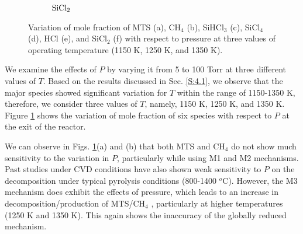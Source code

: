 \documentclass[final, letterpaper, square, comma, numbers, sort&compress]{elsarticle}
\begin{document}
\begin{figure}
\begin{subfigure}{0.49\textwidth}
        \caption{$\rm SiCl_2$}
    \end{subfigure}
    \caption{Variation of mole fraction of MTS (a), CH$_4$ (b), SiHCl$_3$ (c), SiCl$_4$ (d), HCl (e), and SiCl$_2$ (f) with respect to pressure at three values of operating temperature (1150 K, 1250 K, and 1350 K).}
    \label{fig:7}
\end{figure}

We examine the effects of $P$ by varying it from 5 to 100 Torr at three different values of $T$. Based on the results discussed in Sec. \ref{S:4.1}, we observe that the major species showed significant variation for $T$ within the range of 1150-1350 K, therefore, we consider three values of $T$, namely, 1150 K, 1250 K, and 1350 K. Figure \ref{fig:7} shows the variation of mole fraction of six species with respect to $P$ at the exit of the reactor. 

We can observe in Figs. \ref{fig:7}(a) and (b) that both MTS and CH$_4$ do not show much sensitivity to the variation in $P$, particularly while using M1 and M2 mechanisms. Past studies under CVD conditions have also shown weak sensitivity to $P$ on the decomposition under typical pyrolysis conditions (800-1400 $^o$C). However, the M3 mechanism does exhibit the effects of pressure, which leads to an increase in decomposition/production of MTS/CH$_4$ , particularly at higher temperatures (1250 K and 1350 K). This again shows the inaccuracy of the globally reduced mechanism. 
\end{document}
